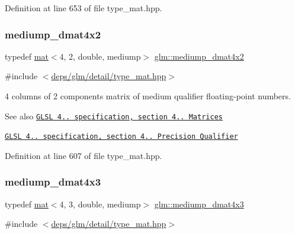 Definition at line 653 of file type\+\_\+mat.\+hpp.

\mbox{\label{group__core__precision_ga0ef199d025bd14f9fc8f3ebd2b8daaa5}} 
\subsubsection{\texorpdfstring{mediump\+\_\+dmat4x2}{mediump\_dmat4x2}}
{\footnotesize\ttfamily typedef \hyperlink{structglm_1_1mat}{mat}$<$4, 2, double, mediump$>$ \hyperlink{group__core__precision_ga0ef199d025bd14f9fc8f3ebd2b8daaa5}{glm\+::mediump\+\_\+dmat4x2}}



{\ttfamily \#include $<$\hyperlink{type__mat_8hpp}{deps/glm/detail/type\+\_\+mat.\+hpp}$>$}

4 columns of 2 components matrix of medium qualifier floating-\/point numbers.

\begin{DoxySeeAlso}{See also}
\href{http://www.opengl.org/registry/doc/GLSLangSpec.4.20.8.pdf}{\tt G\+L\+SL 4.. specification, section 4.. Matrices} 

\href{http://www.opengl.org/registry/doc/GLSLangSpec.4.20.8.pdf}{\tt G\+L\+SL 4.. specification, section 4.. Precision Qualifier} 
\end{DoxySeeAlso}


Definition at line 607 of file type\+\_\+mat.\+hpp.

\mbox{\label{group__core__precision_ga3c31b359e06498f36aae9bfde929a8ce}} 
\subsubsection{\texorpdfstring{mediump\+\_\+dmat4x3}{mediump\_dmat4x3}}
{\footnotesize\ttfamily typedef \hyperlink{structglm_1_1mat}{mat}$<$4, 3, double, mediump$>$ \hyperlink{group__core__precision_ga3c31b359e06498f36aae9bfde929a8ce}{glm\+::mediump\+\_\+dmat4x3}}



{\ttfamily \#include $<$\hyperlink{type__mat_8hpp}{deps/glm/detail/type\+\_\+mat.\+hpp}$>$}

